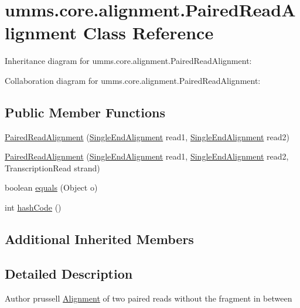 \hypertarget{classumms_1_1core_1_1alignment_1_1_paired_read_alignment}{\section{umms.\+core.\+alignment.\+Paired\+Read\+Alignment Class Reference}
\label{classumms_1_1core_1_1alignment_1_1_paired_read_alignment}
}


Inheritance diagram for umms.\+core.\+alignment.\+Paired\+Read\+Alignment\+:


Collaboration diagram for umms.\+core.\+alignment.\+Paired\+Read\+Alignment\+:
\subsection*{Public Member Functions}
\begin{DoxyCompactItemize}
\item 
\hyperlink{classumms_1_1core_1_1alignment_1_1_paired_read_alignment_a5c0f97c441739e3185560f2dc089c1a3}{Paired\+Read\+Alignment} (\hyperlink{classumms_1_1core_1_1alignment_1_1_single_end_alignment}{Single\+End\+Alignment} read1, \hyperlink{classumms_1_1core_1_1alignment_1_1_single_end_alignment}{Single\+End\+Alignment} read2)
\item 
\hyperlink{classumms_1_1core_1_1alignment_1_1_paired_read_alignment_a6609a3c5287be9f501817f0971ede078}{Paired\+Read\+Alignment} (\hyperlink{classumms_1_1core_1_1alignment_1_1_single_end_alignment}{Single\+End\+Alignment} read1, \hyperlink{classumms_1_1core_1_1alignment_1_1_single_end_alignment}{Single\+End\+Alignment} read2, Transcription\+Read strand)
\item 
boolean \hyperlink{classumms_1_1core_1_1alignment_1_1_paired_read_alignment_ae4d531f72cc51dcf9845f958eadff207}{equals} (Object o)
\item 
int \hyperlink{classumms_1_1core_1_1alignment_1_1_paired_read_alignment_a86b43049ea137bd9ed11490bfb35ab51}{hash\+Code} ()
\end{DoxyCompactItemize}
\subsection*{Additional Inherited Members}


\subsection{Detailed Description}
\begin{DoxyAuthor}{Author}
prussell \hyperlink{interfaceumms_1_1core_1_1alignment_1_1_alignment}{Alignment} of two paired reads without the fragment in between 
\end{DoxyAuthor}


